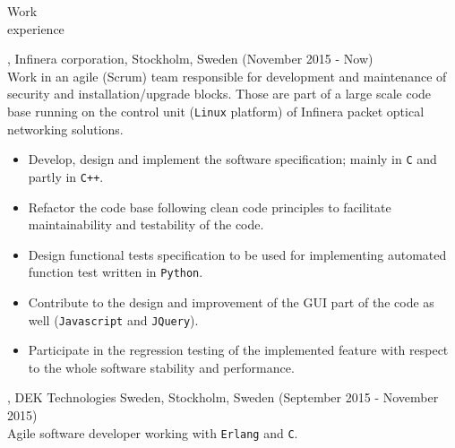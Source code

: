 \documentclass{resume}
\begin{document}
\begin{category}{Work \\experience}

, Infinera corporation, Stockholm, Sweden (November 2015 - Now)\\
Work in an agile (Scrum) team responsible for development and maintenance of security
and installation/upgrade blocks. Those are part of a large scale code base running on 
the control unit (\texttt{Linux} platform) of Infinera packet optical networking solutions.
\begin{itemize}
 \item Develop, design and implement the software specification; mainly in \texttt{C} and partly in \texttt{C++}.
 \item Refactor the code base following clean code principles to facilitate maintainability and testability of the code.
 \item Design functional tests specification to be used for implementing automated function test written in \texttt{Python}.
 \item Contribute to the design and improvement of the GUI part of the code as well (\texttt{Javascript} and \texttt{JQuery}).
 \item Participate in the regression testing of the implemented feature with respect to the whole software stability and performance. 
\end{itemize}

, DEK Technologies Sweden, Stockholm, Sweden (September 2015 - November 2015)\\
Agile software developer working with \texttt{Erlang} and \texttt{C}. 


\end{category}
\end{document}
